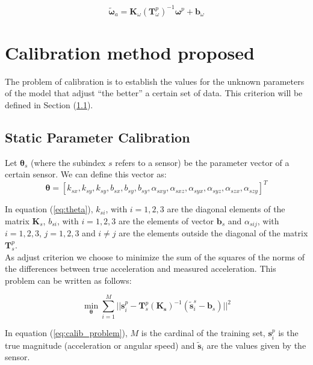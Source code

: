 \documentclass[conference]{IEEEtran}
\newcommand{\refp}[1]{(\ref{#1})}
\begin{document}
\begin{equation}
\tilde{\boldsymbol{\omega}}_a = \mathbf{K}_{\omega}(\mathbf{T}_{\omega}^p)^{-1}\boldsymbol{\omega}^p+\mathbf{b}_{\omega}
\end{equation}

\section{Calibration method proposed}
The problem of calibration is to establish the values for the unknown parameters of the model that adjust ``the better'' a certain set of data. This criterion will be defined in Section \refp{sec:param}. 


\subsection{Static Parameter Calibration}
\label{sec:param}

Let $\boldsymbol{\theta}_s$ (where the subindex $s$ refers to a sensor) be the parameter vector of a certain sensor. We can define this vector as:
\begin{equation}
\boldsymbol{\theta} = [k_{sx},k_{sy},k_{sy},b_{sx},b_{sy},b_{sy}, \alpha_{sxy},\alpha_{sxz},\alpha_{syx},\alpha_{syz},\alpha_{szx},\alpha_{szy}]^T
\label{eq:theta}
\end{equation}

In equation \refp{eq:theta}, $k_{si}$, with $i=1,2,3$ are the diagonal elements of the matrix $\mathbf{K}_s$, $b_{si}$, with $i = 1,2,3$ are the elements of vector $\mathbf{b}_s$ and $\alpha_{sij}$, with $i = 1,2,3$, $j = 1,2,3$ and $i \neq j$ are the elements outside the diagonal of the matrix $\mathbf{T}_s^p$.\\

As adjust criterion we choose to minimize the sum of the squares of the norms of the differences between true acceleration and measured acceleration. This problem can be written as follows:

\begin{equation}
\min_{\boldsymbol{\theta}} \sum_{i = 1}^M ||\mathbf{s}_i^p - \mathbf{T}_s^p(\mathbf{K_s})^{-1}(\tilde{\mathbf{s}}_i^s-\mathbf{b}_s) ||^2
\label{eq:calib_problem}
\end{equation}

In equation \refp{eq:calib_problem}, $M$ is the cardinal of the training set, $\mathbf{s}_i^p$ is the true magnitude (acceleration or angular speed) and $\tilde{\mathbf{s}}_i$ are the values given by the sensor.\\
\end{document}

